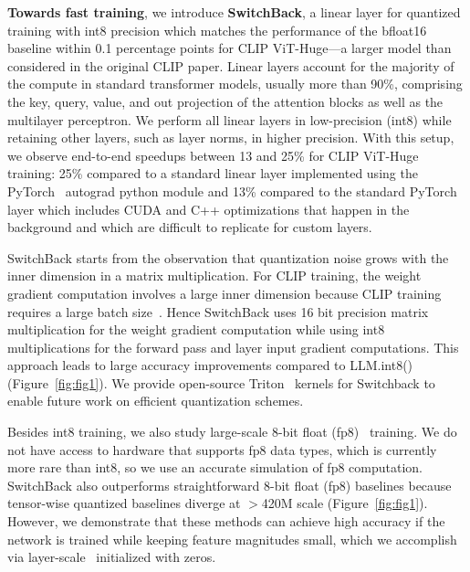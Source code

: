 \textbf{Towards fast training}, we introduce \textbf{SwitchBack}, a linear layer for quantized training with int8 precision which matches the performance of the bfloat16~\cite{wang2019bfloat16} baseline within 0.1 percentage points for CLIP ViT-Huge---a larger model than considered in the original CLIP paper. Linear layers account for the majority of the compute in standard transformer models, usually more than 90\%, comprising the key, query, value, and out projection of the attention blocks as well as the multilayer perceptron. We perform all linear layers in low-precision (int8) while retaining other layers, such as layer norms, in higher precision. With this setup, we observe end-to-end speedups between 13 and 25\% for CLIP ViT-Huge training: 25\% compared to a standard linear layer implemented using the PyTorch~\cite{paszke2019pytorch} autograd python module and 13\% compared to the standard PyTorch layer which includes CUDA and C++ optimizations that happen in the background and which are difficult to replicate for custom layers.

SwitchBack starts from the observation that quantization noise grows with the inner dimension in a matrix multiplication. For CLIP training, the weight gradient computation involves a large inner dimension because CLIP training requires a large batch size~\cite{pham2021scaling}. Hence SwitchBack uses 16 bit precision matrix multiplication for the weight gradient computation while using int8 multiplications for the forward pass and layer input gradient computations. This approach leads to large accuracy improvements compared to LLM.int8()~\cite{dettmers2022llm} (Figure~\ref{fig:fig1}).
We provide open-source Triton~\cite{tillet2019triton} kernels for Switchback to enable future work on efficient quantization schemes.

Besides int8 training, we also study large-scale 8-bit float (fp8)~\cite{micikevicius2022fp8} training. We do not have access to hardware that supports fp8 data types, which is currently more rare than int8, so we use an accurate simulation of fp8 computation. SwitchBack also outperforms straightforward 8-bit float (fp8) baselines because tensor-wise quantized baselines diverge at $>$420M scale (Figure~\ref{fig:fig1}).
However, we demonstrate that these methods can achieve high accuracy if the network is trained while keeping feature magnitudes small, which we accomplish via layer-scale~\cite{touvron2021going} initialized with zeros.

